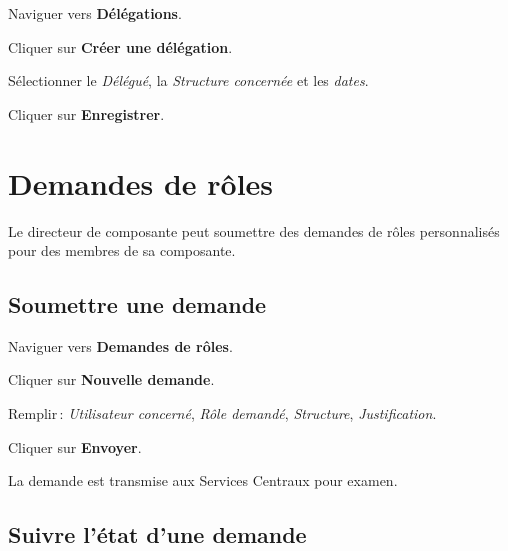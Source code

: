 \begin{steps}
  \item Naviguer vers \textbf{D\'el\'egations}.
  \item Cliquer sur \textbf{Cr\'eer une d\'el\'egation}.
  \item S\'electionner le \textit{D\'el\'egu\'e}, la \textit{Structure concern\'ee} et les \textit{dates}.
  \item Cliquer sur \textbf{Enregistrer}.
\end{steps}


\section{Demandes de r\^oles}

Le directeur de composante peut soumettre des demandes de r\^oles personnalis\'es pour des membres de sa composante.

\subsection{Soumettre une demande}

\begin{steps}
  \item Naviguer vers \textbf{Demandes de r\^oles}.
  \item Cliquer sur \textbf{Nouvelle demande}.
  \item Remplir\,: \textit{Utilisateur concern\'e}, \textit{R\^ole demand\'e}, \textit{Structure}, \textit{Justification}.
  \item Cliquer sur \textbf{Envoyer}.
  \item La demande est transmise aux Services Centraux pour examen.
\end{steps}


\subsection{Suivre l'\'etat d'une demande}

